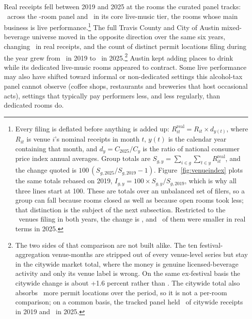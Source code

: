 Real receipts fell between 2019 and 2025 at the rooms the curated panel
tracks: \NVenuePanelPctTwoZeroOneNineTwoZeroTwoFive\ across the
\NVenuePanelIsCurated-room panel and
\NVenueCorePctTwoZeroOneNineTwoZeroTwoFive\ in its core live-music tier, the
rooms whose main business is live performance.\footnote{Every filing is
deflated before anything is added up:
\(R^{\mathrm{real}}_{it} = R_{it} \times d_{y(t)}\), where \(R_{it}\) is venue
\(i\)'s nominal receipts in month \(t\), \(y(t)\) is the calendar year
containing that month, and \(d_y = C_{2025}/C_y\) is the ratio of national
consumer price index annual averages. Group totals are
\(S_{g,y} = \sum_{i \in g} \sum_{t \in y} R^{\mathrm{real}}_{it}\), and the
change quoted is \(100\,(S_{g,2025}/S_{g,2019} - 1)\).
Figure~\ref{fig:venueindex} plots the same totals rebased on 2019,
\(I_{g,y} = 100 \times S_{g,y}/S_{g,2019}\), which is why all three lines
start at 100. These are totals over an unbalanced set of filers, so a group
can fall because rooms closed as well as because open rooms took less; that
distinction is the subject of the next subsection. Restricted to the
\NVenueBalancedN\ venues filing in both years, the change is
\NVenueBalancedPctTwoZeroOneNineTwoZeroTwoFive, and
\NVenueShrankBalancedN\ of them were smaller in real terms in 2025.} The full
Travis County and City of Austin mixed-beverage universe moved in the opposite
direction over the same six years, changing
\NVenueCitywidePctTwoZeroOneNineTwoZeroTwoFive\ in real receipts, and the count
of distinct permit locations filing during the year grew from
\NVenueCitywidePermitsTwoZeroOneNine\ in 2019 to
\NVenueCitywidePermitsTwoZeroTwoFive\ in 2025.\footnote{The two sides of that comparison
are not built alike. The ten festival-aggregation venue-months are stripped out
of every venue-level series but stay in the citywide market total, where the
money is genuine licensed-beverage activity and only its venue label is wrong.
On the same ex-festival basis the citywide change is about +1.6 percent rather
than \NVenueCitywidePctTwoZeroOneNineTwoZeroTwoFive. The citywide total also
absorbs \NVenueCitywidePermitsPctTwoZeroOneNineTwoZeroTwoFive\ more permit
locations over the period, so it is not a per-room comparison; on a common
basis, the tracked panel held \NVenuePanelShareTwoZeroOneNine\ of citywide
receipts in 2019 and \NVenuePanelShareTwoZeroTwoFive\ in 2025.} Austin kept
adding places to drink while its dedicated live-music rooms appeared to
contract. Some live performance may also have shifted toward informal or
non-dedicated settings this alcohol-tax panel cannot observe (coffee shops,
restaurants and breweries that host occasional acts), settings that typically
pay performers less, and less regularly, than dedicated rooms do.

